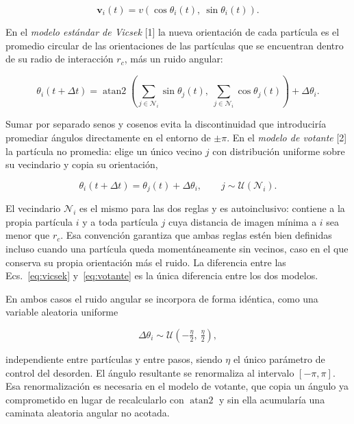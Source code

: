 \documentclass[11pt]{article}
\newcommand{\vect}[1]{\mathbf{#1}}
\begin{document}
\begin{equation}
  \vect{v}_i(t) = v \left( \cos\theta_i(t),\ \sin\theta_i(t) \right).
  \label{eq:velocidad}
\end{equation}

En el \emph{modelo estándar de Vicsek} [1] la nueva orientación de cada
partícula es el promedio circular de las orientaciones de las partículas que se
encuentran dentro de su radio de interacción $r_c$, más un ruido angular:

\begin{equation}
  \theta_i(t+\Delta t) = \operatorname{atan2}\!\left(
    \sum_{j \in \mathcal{N}_i} \sin\theta_j(t),\;
    \sum_{j \in \mathcal{N}_i} \cos\theta_j(t)
  \right) + \Delta\theta_i .
  \label{eq:vicsek}
\end{equation}

Sumar por separado senos y cosenos evita la discontinuidad que introduciría
promediar ángulos directamente en el entorno de $\pm\pi$. En el \emph{modelo de
votante} [2] la partícula no promedia: elige un único vecino $j$ con
distribución uniforme sobre su vecindario y copia su orientación,

\begin{equation}
  \theta_i(t+\Delta t) = \theta_j(t) + \Delta\theta_i,
  \qquad j \sim \mathcal{U}(\mathcal{N}_i).
  \label{eq:votante}
\end{equation}

El vecindario $\mathcal{N}_i$ es el mismo para las dos reglas y es
autoinclusivo: contiene a la propia partícula $i$ y a toda partícula $j$ cuya
distancia de imagen mínima a $i$ sea menor que $r_c$. Esa convención garantiza
que ambas reglas estén bien definidas incluso cuando una partícula queda
momentáneamente sin vecinos, caso en el que conserva su propia orientación más
el ruido. La diferencia entre las Ecs.~\eqref{eq:vicsek} y~\eqref{eq:votante} es
la única diferencia entre los dos modelos.

En ambos casos el ruido angular se incorpora de forma idéntica, como una
variable aleatoria uniforme

\begin{equation}
  \Delta\theta_i \sim \mathcal{U}\!\left(-\tfrac{\eta}{2},\ \tfrac{\eta}{2}\right),
  \label{eq:ruido}
\end{equation}

independiente entre partículas y entre pasos, siendo $\eta$ el único parámetro
de control del desorden. El ángulo resultante se renormaliza al intervalo
$[-\pi, \pi]$. Esa renormalización es necesaria en el modelo de votante, que
copia un ángulo ya comprometido en lugar de recalcularlo con
$\operatorname{atan2}$ y sin ella acumularía una caminata aleatoria angular no
acotada.
\end{document}
